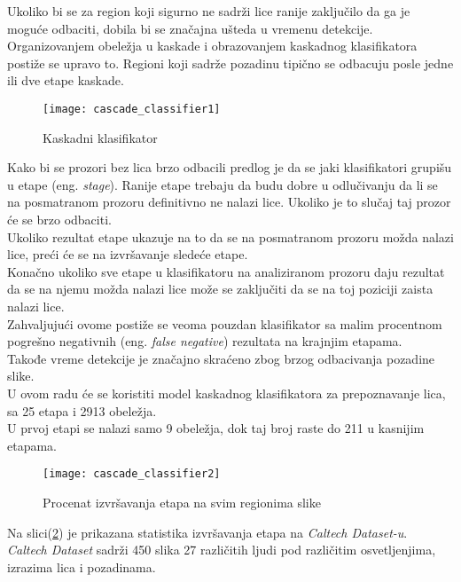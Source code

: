 Ukoliko bi se za region koji sigurno ne sadrži lice ranije zaključilo da ga je
moguće odbaciti, dobila bi se značajna ušteda u vremenu detekcije. \\
Organizovanjem obeležja u kaskade i obrazovanjem kaskadnog klasifikatora postiže
se upravo to.
Regioni koji sadrže pozadinu tipično se odbacuju posle jedne ili dve etape
kaskade. \\

\begin{figure}[H]
  \centering
  \texttt{[image: cascade\_classifier1]}
  \caption{Kaskadni klasifikator \cite{Jensen2008ImplementingTV}}
  \label{cascade_classifier_img1}
\end{figure}

Kako bi se prozori bez lica brzo odbacili predlog je da se jaki klasifikatori
grupišu u etape (eng. \emph{stage}). Ranije etape trebaju da budu dobre u
odlučivanju da li se na posmatranom prozoru definitivno ne nalazi lice.
Ukoliko je to slučaj taj prozor će se brzo odbaciti. \\
Ukoliko rezultat etape ukazuje na to da se na posmatranom prozoru možda nalazi lice, preći
će se na izvršavanje sledeće etape. \\

Konačno ukoliko sve etape u klasifikatoru na analiziranom prozoru daju rezultat
da se na njemu možda nalazi lice može se zaključiti da se na toj poziciji zaista nalazi lice. \\
Zahvaljujući ovome postiže se veoma pouzdan klasifikator sa malim procentnom
pogrešno negativnih (eng. \emph{false negative}) rezultata na krajnjim etapama. \\
Takođe vreme detekcije je značajno skraćeno zbog brzog odbacivanja pozadine
slike. \\

U ovom radu će se koristiti model kaskadnog klasifikatora za
prepoznavanje lica, sa 25 etapa i 2913 obeležja. \\
U prvoj etapi se nalazi samo 9 obeležja, dok taj broj raste do 211 u kasnijim etapama.

\begin{figure}[H]
  \centering
  \texttt{[image: cascade\_classifier2]}
  \caption{Procenat izvršavanja etapa na svim regionima slike}
  \label{cascade_classifier_img2}
\end{figure}

Na slici(\ref{cascade_classifier_img2}) je prikazana statistika izvršavanja
etapa na \emph{Caltech Dataset-u}\cite{CALTECH_DATASET}.\\
\emph{Caltech Dataset} sadrži 450 slika 27 različitih
ljudi pod različitim osvetljenjima, izrazima lica i pozadinama. \\

